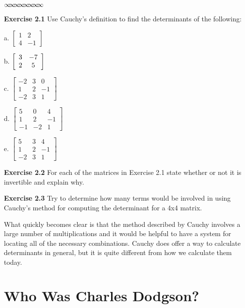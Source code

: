 \documentclass[11pt]{article}%
\theoremstyle{definition}
\newcommand{\sep}{\vspace{-3pt} \begin{center}
{\mathversion{normal}
$\infty \mspace{-5.5mu} \infty \mspace{-5.5mu}
\infty \mspace{-5.5mu} \infty \mspace{-5.5mu}
\infty \mspace{-5.5mu} \infty \mspace{-5.5mu}
\infty \mspace{-5.5mu} \infty$}
\end{center} \vspace{-3pt}}
\begin{document}
%

\sep


\noindent\textbf{Exercise 2.1} Use Cauchy's definition to find the
determinants of the following:

a. $%
\begin{bmatrix}
1 & 2\\
4 & -1
\end{bmatrix}
$

b. $\left[
\begin{array}
[c]{cc}%
3 & -7\\
2 & 5
\end{array}
\right]  $

c. $%
\begin{bmatrix}
-2 & 3 & 0\\
1 & 2 & -1\\
-2 & 3 & 1
\end{bmatrix}
$

d. $%
\begin{bmatrix}
5 & 0 & 4\\
1 & 2 & -1\\
-1 & -2 & 1
\end{bmatrix}
$

e. $%
\begin{bmatrix}
5 & 3 & 4\\
1 & 2 & -1\\
-2 & 3 & 1
\end{bmatrix}
$

\bigskip

\noindent\textbf{Exercise 2.2} For each of the matrices in Exercise 2.1 state
whether or not it is invertible and explain why.

\bigskip

\noindent\textbf{Exercise 2.3 }Try to determine how many terms would be
involved in using Cauchy's method for computing the determinant for a 4x4 matrix.

\bigskip

What quickly becomes clear is that the method described by Cauchy involves a
large number of multiplications and it would be helpful to have a system for
locating all of the necessary combinations. Cauchy does offer a way to
calculate determinants in general, but it is quite different from how we
calculate them today.

\section{Who Was Charles Dodgson?}
\end{document}

